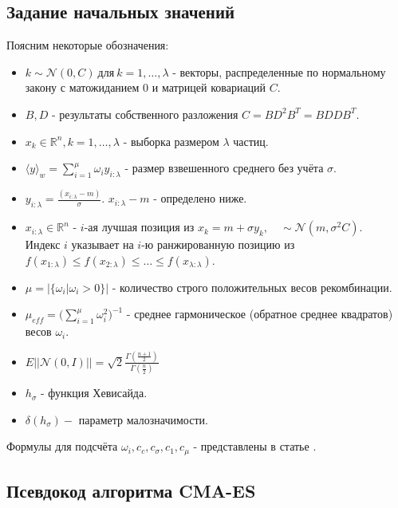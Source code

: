 \subsection{Задание начальных значений}
Поясним некоторые обозначения:
\begin{itemize}
	\item $k \sim \mathcal{N}(0, C) \ \text{для} \ k = 1, \ldots, \lambda$ - векторы, распределенные по нормальному закону с матожиданием $0$ и матрицей ковариаций $C$.
	\item $B, D$ - результаты собственного разложения $C = BD^2B^T = BDDB^T$.
	\item  $x_k \in \mathbb{R}^n, k = 1, \ldots, \lambda$ - выборка размером $\lambda$ частиц.
	\item $\langle y \rangle_w = \sum_{i=1}^{\mu}\omega_iy_{i:\lambda}$ - размер взвешенного среднего без учёта $\sigma$.
	\item $y_{i:\lambda} = \frac{(x_{i:\lambda} - m)}{\sigma}$. $x_{i:\lambda} - m$ - определено ниже.
	\item $x_{i:\lambda} \in \mathbb{R}^n$ - $i$-ая лучшая позиция из $x_k = m + \sigma y_k, \quad \sim \mathcal{N}(m, \sigma^2C)$.\\
	Индекс $i$ указывает на $i$-ю ранжированную позицию из $f(x_{1:\lambda}) \leq f(x_{2:\lambda}) \leq \ldots \leq f(x_{\lambda:\lambda})$.
	\item $\mu = |\{\omega_i| \omega_i > 0\}|$ - количество строго положительных весов рекомбинации.
	\item $\mu_{eff} = \bigg( \sum_{i=1}^{\mu}\omega_i^{2}\bigg)^{-1}$ - среднее гармоническое (обратное среднее квадратов) весов $\omega_i$.
	\item $\displaystyle E||\mathcal{N}(0,I)|| = \sqrt{2}\frac{\Gamma(\frac{n+1}{2})}{\Gamma(\frac{n}{2})}$
	\item $h_\sigma$ - функция Хевисайда.
	\item $\delta(h_{\sigma}) -$ параметр малозначимости.
\end{itemize}
Формулы для подсчёта $\omega_i, c_c, c_\sigma, c_1, c_\mu$ - представлены в статье \cite{HansenCmaes}.
\subsection{Псевдокод алгоритма CMA-ES}

\clearpage
\newpage
